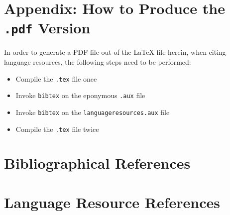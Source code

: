\documentclass[10pt, a4paper]{article}
\begin{document}
\vspace{.3\baselineskip}

\section*{Appendix: How to Produce the \texttt{.pdf} Version}

In order to generate a PDF file out of the LaTeX file herein, when citing
language resources, the following steps need to be performed:

\begin{itemize}
    \item{Compile the \texttt{.tex} file once}
    \item{Invoke \texttt{bibtex} on the eponymous \texttt{.aux} file}
    \item{Invoke \texttt{bibtex} on the \texttt{languageresources.aux} file}
    \item{Compile the \texttt{.tex} file twice}
\end{itemize}

\section{Bibliographical References}
\label{main:ref}





\section{Language Resource References}
\label{lr:ref}
\end{document}
